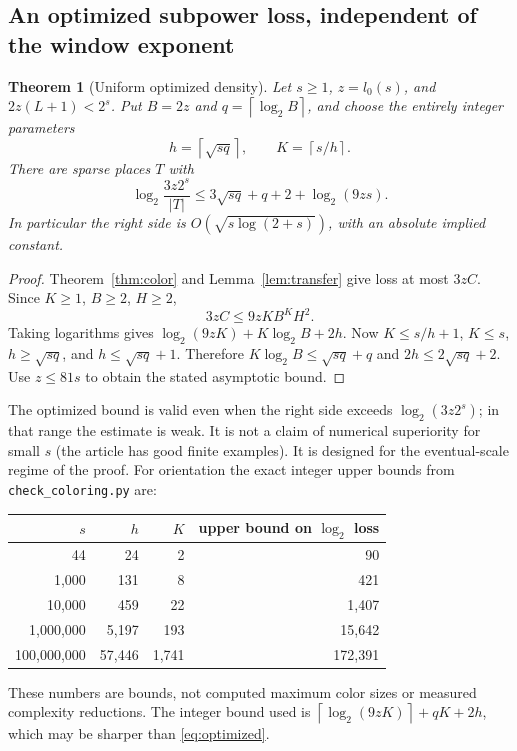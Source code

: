 \documentclass[11pt]{article}
\newtheorem{theorem}{Theorem}[section]
\theoremstyle{remark}\newtheorem{remark}[theorem]{Remark}
\newcommand{\ceil}[1]{\left\lceil #1\right\rceil}
\newcommand{\src}[1]{\texttt{#1}}
\begin{document}
\subsection{An optimized subpower loss, independent of the window exponent}
\begin{theorem}[Uniform optimized density]\label{thm:opt}
Let $s\ge1$, $z=l_0(s)$, and $2z(L+1)<2^s$. Put $B=2z$ and $q=\ceil{\log_2 B}$, and choose the entirely integer parameters
\[
 h=\ceil{\sqrt{s q}},\qquad K=\ceil{s/h}.
\]
There are sparse places $T$ with
\begin{equation}\label{eq:optimized}
 \log_2\frac{3z2^s}{|T|}
 \le 3\sqrt{sq}+q+2+\log_2(9zs).
\end{equation}
In particular the right side is $O(\sqrt{s\log(2+s)})$, with an absolute implied constant.
\end{theorem}
\begin{proof}
Theorem~\ref{thm:color} and Lemma~\ref{lem:transfer} give loss at most $3zC$. Since $K\ge1$, $B\ge2$, $H\ge2$,
\[
 3zC\le9zK B^K H^2.
\]
Taking logarithms gives $\log_2(9zK)+K\log_2 B+2h$. Now $K\le s/h+1$, $K\le s$, $h\ge\sqrt{sq}$, and $h\le\sqrt{sq}+1$. Therefore $K\log_2 B\le \sqrt{sq}+q$ and $2h\le2\sqrt{sq}+2$. Use $z\le81s$ to obtain the stated asymptotic bound.
\end{proof}

The optimized bound is valid even when the right side exceeds $\log_2(3z2^s)$; in that range the estimate is weak. It is not a claim of numerical superiority for small $s$ (the article has good finite examples). It is designed for the eventual-scale regime of the proof. For orientation the exact integer upper bounds from \src{check\_coloring.py} are:
\begin{center}\small
\begin{tabular}{rrrr}
\toprule
$s$ & $h$ & $K$ & upper bound on $\log_2$ loss \\
\midrule
44 & 24 & 2 & 90\\
1,000 & 131 & 8 & 421\\
10,000 & 459 & 22 & 1,407\\
1,000,000 & 5,197 & 193 & 15,642\\
100,000,000 & 57,446 & 1,741 & 172,391\\
\bottomrule
\end{tabular}
\end{center}
These numbers are bounds, not computed maximum color sizes or measured complexity reductions. The integer bound used is $\ceil{\log_2(9zK)}+qK+2h$, which may be sharper than \eqref{eq:optimized}.
\end{document}
